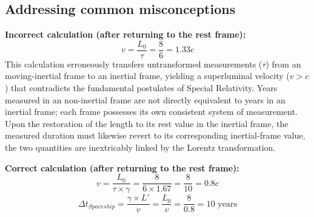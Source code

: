 \documentclass[pdflatex,sn-basic]{sn-jnl}
\theoremstyle{thmstyleone}%
\theoremstyle{thmstyletwo}%
\theoremstyle{thmstylethree}%
\begin{document}
	\subsection{ Addressing common misconceptions}\label{subsec3_6}
		\textbf{Incorrect calculation (after returning to the rest frame):}
			\begin{equation*}
  				v = \frac{L_0}{\tau} = \frac{8}{6} = 1.33c 
			\end{equation*}
	This calculation erroneously transfers untransformed measurements ($\tau$) from an moving-inertial frame to an inertial frame, yielding a superluminal velocity ($v > c$) that contradicts the fundamental postulates of Special Relativity. Years measured in an non-inertial frame are not directly equivalent to years in an inertial frame; each frame possesses its own consistent system of measurement. Upon the restoration of the length to its rest value in the inertial frame, the measured duration must likewise revert to its corresponding inertial-frame value, the two quantities are inextricably linked by the Lorentz transformation.

		\textbf{Correct calculation (after returning to the rest frame):}
			\begin{equation*}
  				v = \frac{L_0}{\tau \times \gamma} = \frac{8}{6 \times 1.67} = \frac{8}{10} = 0.8c
			\end{equation*}
			\begin{equation*}
  				\Delta t_{Spaceship} = \frac{\gamma \times L'}{v} = \frac{L_0}{v}=\frac{8}{0.8} = 10 					\text{ years}
			\end{equation*}
\end{document}
